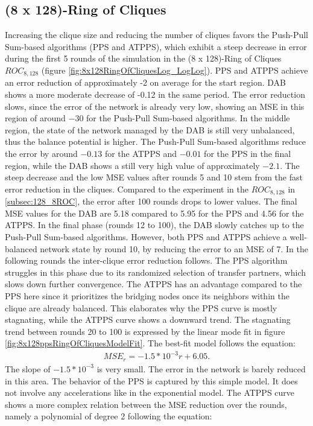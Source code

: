 \subsection{(8 x 128)-Ring of Cliques}\label{subsec:8_128ROC}
Increasing the clique size and reducing the number of cliques favors the Push-Pull Sum-based algorithms (PPS and ATPPS), which exhibit a steep decrease in error during the first 5 rounds of the simulation in the (8 x 128)-Ring of Cliques $ROC_{8,128}$ (figure \ref{fig:8x128RingOfCliquesLog_LogLog}). PPS and ATPPS achieve an error reduction of approximately -2 on average for the start region. DAB shows a more moderate decrease of -0.12 in the same period. The error reduction slows, since the error of the network is already very low, showing an MSE in this region of around $-30$ for the Push-Pull Sum-based algorithms. In the middle region, the state of the network managed by the DAB is still very unbalanced, thus the balance potential is higher. The Push-Pull Sum-based algorithms reduce the error by around $-0.13$ for the ATPPS and $-0.01$ for the PPS in the final region, while the DAB shows a still very high value of approximately $-2.1$. The steep decrease and the low MSE values after rounds 5 and 10 stem from the fast error reduction in the cliques. Compared to the experiment in the $ROC_{8, 128}$ in \ref{subsec:128_8ROC}, the error after 100 rounds drops to lower values. The final MSE values for the DAB are 5.18 compared to 5.95 for the PPS and 4.56 for the ATPPS. In the final phase (rounds 12 to 100), the DAB slowly catches up to the Push-Pull Sum-based algorithms. However, both PPS and ATPPS achieve a well-balanced network state by round 10, by reducing the error to an MSE of 7. In the following rounds the inter-clique error reduction follows. The PPS algorithm struggles in this phase due to its randomized selection of transfer partners, which slows down further convergence. The ATPPS has an advantage compared to the PPS here since it prioritizes the bridging nodes once its neighbors within the clique are already balanced. This elaborates why the PPS curve is mostly stagnating, while the ATPPS curve shows a downward trend. The stagnating trend between rounds 20 to 100 is expressed by the linear mode fit in figure \ref{fig:8x128ppsRingOfCliquesModelFit}. The best-fit model follows the equation:
\begin{align}
    MSE_r=-1.5*10^{-3}r+6.05. 
\end{align}
The slope of $-1.5*10^{-3}$ is very small. The error in the network is barely reduced in this area. The behavior of the PPS is captured by this simple model. It does not involve any accelerations like in the exponential model. The ATPPS curve shows a more complex relation between the MSE reduction over the rounds, namely a polynomial of degree 2 following the equation:
